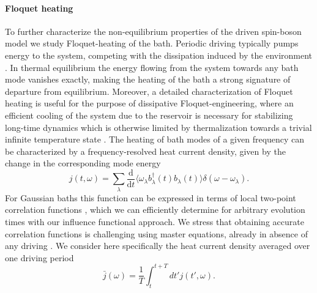 \documentclass[aps,prb, twocolumn,superscriptaddress]{revtex4-2}
\newcommand{\diff}{\mathrm{d}}
\begin{document}
\paragraph*{Floquet heating}

To further characterize the non-equilibrium properties of the driven spin-boson model we study Floquet-heating of the bath. Periodic driving typically pumps energy to the system, competing with the dissipation induced by the environment \cite{kato2016Quantum,Gribben2022Oct, albarelli2024Pseudomode}. In thermal equilibrium the energy flowing from the system towards any bath mode vanishes exactly, making the heating of the bath a strong signature of departure from equilibrium. Moreover, a detailed characterization of Floquet heating is useful for the purpose of dissipative Floquet-engineering, where an efficient cooling of the system due to the reservoir is necessary for stabilizing long-time dynamics which is otherwise limited by thermalization towards a trivial infinite temperature state \cite{eckardt2017Colloquium, Ritter2025}.
The heating of bath modes of a given frequency can be characterized by a frequency-resolved heat current density, given by the change in the corresponding mode energy
\begin{equation}
    j(t,\omega) = \sum_\lambda \frac{\diff}{\diff t}\langle\omega_\lambda b^\dagger_\lambda(t) b_\lambda(t)\rangle \delta(\omega-\omega_\lambda).
\end{equation}
For Gaussian baths this function can be expressed in terms of local two-point correlation functions \cite{Gribben2022Oct, albarelli2024Pseudomode}, which we can efficiently determine for arbitrary evolution times with our influence functional approach. We stress that obtaining accurate correlation functions is challenging using master equations, already in absence of any driving \cite{koyanagi2024Classical, keeling2025Process}. We consider here specifically the heat current density averaged over one driving period
\begin{equation}\label{eq:av_heat_current}
    \bar j(\omega)=\frac{1}{T}\int_{t}^{t+T} dt' j(t',\omega).
\end{equation}
\end{document}
